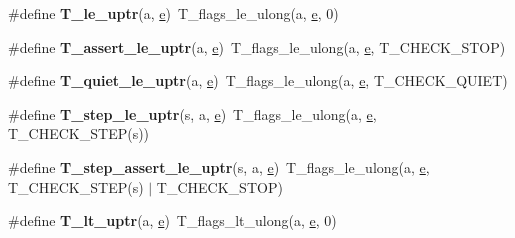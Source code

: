 \begin{DoxyCompactItemize}
\#define {\bfseries T\+\_\+le\+\_\+uptr}(a,  \mbox{\hyperlink{sun4u_2tte_8h_a8b0b9ed08e0e18920ec2682f48228c27}{e}})~T\+\_\+flags\+\_\+le\+\_\+ulong(a, \mbox{\hyperlink{sun4u_2tte_8h_a8b0b9ed08e0e18920ec2682f48228c27}{e}}, 0)
\item 
\mbox{\label{group__RTEMSTestFrameworkChecksUIntptr_gaa49b7a412681ad47b364eee28947e5d8}} 
\#define {\bfseries T\+\_\+assert\+\_\+le\+\_\+uptr}(a,  \mbox{\hyperlink{sun4u_2tte_8h_a8b0b9ed08e0e18920ec2682f48228c27}{e}})~T\+\_\+flags\+\_\+le\+\_\+ulong(a, \mbox{\hyperlink{sun4u_2tte_8h_a8b0b9ed08e0e18920ec2682f48228c27}{e}}, T\+\_\+\+C\+H\+E\+C\+K\+\_\+\+S\+T\+OP)
\item 
\mbox{\label{group__RTEMSTestFrameworkChecksUIntptr_gab7f080ee141bd99ee9726dcc38a26764}} 
\#define {\bfseries T\+\_\+quiet\+\_\+le\+\_\+uptr}(a,  \mbox{\hyperlink{sun4u_2tte_8h_a8b0b9ed08e0e18920ec2682f48228c27}{e}})~T\+\_\+flags\+\_\+le\+\_\+ulong(a, \mbox{\hyperlink{sun4u_2tte_8h_a8b0b9ed08e0e18920ec2682f48228c27}{e}}, T\+\_\+\+C\+H\+E\+C\+K\+\_\+\+Q\+U\+I\+ET)
\item 
\mbox{\label{group__RTEMSTestFrameworkChecksUIntptr_gad8b39a6eeec9c6267d004bef31ddd617}} 
\#define {\bfseries T\+\_\+step\+\_\+le\+\_\+uptr}(s,  a,  \mbox{\hyperlink{sun4u_2tte_8h_a8b0b9ed08e0e18920ec2682f48228c27}{e}})~T\+\_\+flags\+\_\+le\+\_\+ulong(a, \mbox{\hyperlink{sun4u_2tte_8h_a8b0b9ed08e0e18920ec2682f48228c27}{e}}, T\+\_\+\+C\+H\+E\+C\+K\+\_\+\+S\+T\+EP(s))
\item 
\mbox{\label{group__RTEMSTestFrameworkChecksUIntptr_ga06c847de92985185cc64b8a4f962d45d}} 
\#define {\bfseries T\+\_\+step\+\_\+assert\+\_\+le\+\_\+uptr}(s,  a,  \mbox{\hyperlink{sun4u_2tte_8h_a8b0b9ed08e0e18920ec2682f48228c27}{e}})~T\+\_\+flags\+\_\+le\+\_\+ulong(a, \mbox{\hyperlink{sun4u_2tte_8h_a8b0b9ed08e0e18920ec2682f48228c27}{e}}, T\+\_\+\+C\+H\+E\+C\+K\+\_\+\+S\+T\+EP(s) $\vert$ T\+\_\+\+C\+H\+E\+C\+K\+\_\+\+S\+T\+OP)
\item 
\mbox{\label{group__RTEMSTestFrameworkChecksUIntptr_ga4ac36bf166c527ae1bed47dbe1506e00}} 
\#define {\bfseries T\+\_\+lt\+\_\+uptr}(a,  \mbox{\hyperlink{sun4u_2tte_8h_a8b0b9ed08e0e18920ec2682f48228c27}{e}})~T\+\_\+flags\+\_\+lt\+\_\+ulong(a, \mbox{\hyperlink{sun4u_2tte_8h_a8b0b9ed08e0e18920ec2682f48228c27}{e}}, 0)

\end{DoxyCompactItemize}
